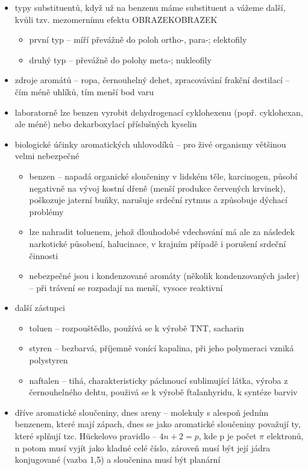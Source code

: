 \documentclass{article}
\begin{document}
\begin{itemize}
\begin{itemize}
  \end{itemize}
  \item typy substituentů, když už na benzenu máme substituent a vážeme další, kvůli tzv. mezomernímu efektu OBRAZEKOBRAZEK
  \begin{itemize}
    \item první typ -- míří převážně do poloh ortho-, para-; elektofily
    \item druhý typ -- převážně do polohy meta-; nukleofily
  \end{itemize}
  \item zdroje aromátů -- ropa, černouhelný dehet, zpracovávání frakční destilací -- čím méně uhlíků, tím menší bod varu
  \item laboratorně lze benzen vyrobit dehydrogenací cyklohexenu (popř. cyklohexan, ale méně) nebo dekarboxylací příslušných kyselin
  \item biologické účinky aromatických uhlovodíků -- pro živé organismy většinou velmi nebezpečné
  \begin{itemize}
    \item benzen -- napadá organické sloučeniny v lidském těle, karcinogen, působí negativně na vývoj kostní dřeně (menší produkce červených krvinek), poškozuje jaterní buňky, narušuje srdeční rytmus a způsobuje dýchací problémy
    \item lze nahradit toluenem, jehož dlouhodobé vdechování má ale za následek narkotické působení, halucinace, v krajním případě i porušení srdeční činnosti
    \item nebezpečné jsou i kondenzované aromáty (několik kondenzovaných jader) -- při trávení se rozpadají na menší, vysoce reaktivní
  \end{itemize}
  \item další zástupci
  \begin{itemize}
    \item toluen -- rozpouštědlo, používá se k výrobě TNT, sacharin
    \item styren -- bezbarvá, příjemně vonící kapalina, při jeho polymeraci vzniká polystyren
    \item naftalen -- tihá, charakteristicky páchnoucí sublimující látka, výroba z černouhelného dehtu, použivá se k výrobě ftalanhyridu, k syntéze barviv
  \end{itemize}
  \item dříve aromatické sloučeniny, dnes areny -- molekuly s alespoň jedním benzenem, které mají zápach, dnes se jako aromatické sloučeniny považují ty, které splňují tzc. Hückelovo pravidlo -- $4n+2=p$, kde p je počet $\pi$ elektronů, n potom musí vyjít jako kladné celé číslo, zároveň musí být její jádra konjugované (vazba 1,5) a sloučenina musí být planární
\end{itemize}
\end{document}
